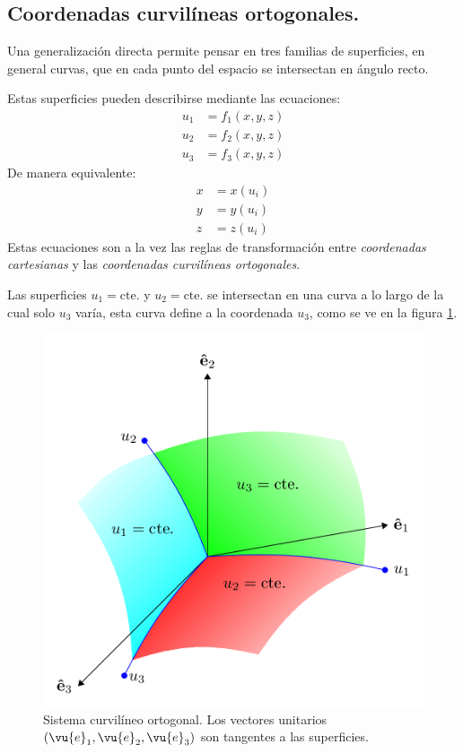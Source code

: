 
\subsection{Coordenadas curvilíneas ortogonales.}

Una generalización directa permite pensar en tres familias de superficies, en general curvas, que en cada punto del espacio se intersectan en ángulo recto.
\par
Estas superficies pueden describirse mediante las ecuaciones:
\begin{align*}
u_{1} &= f_{1}(x, y, z) \\
u_{2} &= f_{2}(x, y, z) \\
u_{3} &= f_{3}(x, y, z)
\end{align*}
De manera equivalente:
\begin{align*}
x &= x(u_{i}) \\
y &= y(u_{i}) \\
z &= z(u_{i})
\end{align*}
Estas ecuaciones son a la vez las reglas de transformación entre \emph{coordenadas cartesianas} y las \emph{coordenadas curvilíneas ortogonales}.
\par
Las superficies $u_{1} = \mbox{cte.}$ y $u_{2} = \mbox{cte.}$ se intersectan en una curva a lo largo de la cual solo $u_{3}$ varía, esta curva define a la coordenada $u_{3}$, como se ve en la figura \ref{fig:figura_Sistema_Curvilineo_Ortogonal}.
\begin{figure}[H]
   \centering
   \includegraphics[scale=0.25]{Imagenes/Sistema_Curvilineo_Ortogonal.png}
   \caption{Sistema curvilíneo ortogonal. Los vectores unitarios $(\vu{e}_{1}, \vu{e}_{2}, \vu{e}_{3})$ son tangentes a las superficies.}
   \label{fig:figura_Sistema_Curvilineo_Ortogonal}
\end{figure}
